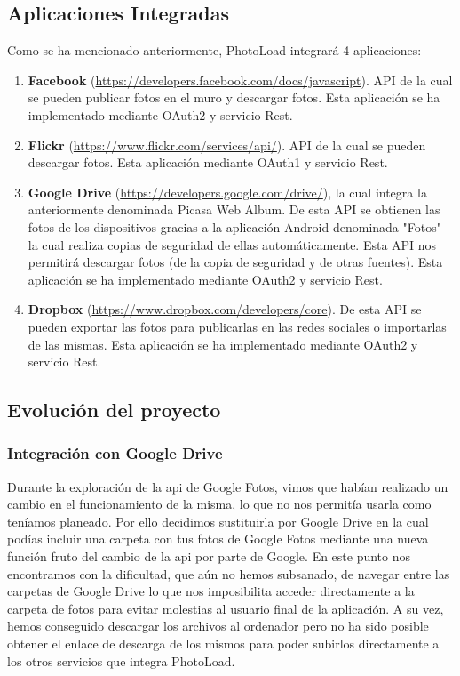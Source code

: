 \documentclass{scrartcl}
\begin{document}
\subsection{Aplicaciones Integradas}\label{cap:APIs Integradas}
Como se ha mencionado anteriormente, PhotoLoad integrará 4 aplicaciones:
\begin{enumerate}[\textbf{\textperiodcentered}]
	\item \textbf{Facebook} (\url{https://developers.facebook.com/docs/javascript}). API de la cual se pueden publicar fotos en el muro y descargar fotos. Esta aplicación se ha implementado mediante OAuth2 y servicio Rest.
	\item \textbf{Flickr} (\url{https://www.flickr.com/services/api/}). API de la cual se pueden descargar fotos. Esta aplicación mediante OAuth1 y servicio Rest.
	\item \textbf{Google Drive} (\url{https://developers.google.com/drive/}), la cual integra la anteriormente denominada Picasa Web Album. De esta API se obtienen las fotos de los dispositivos gracias a la aplicación Android denominada "Fotos" la cual realiza copias de seguridad de ellas automáticamente. Esta API nos permitirá descargar fotos (de la copia de seguridad y de otras fuentes). Esta aplicación se ha implementado mediante OAuth2 y servicio Rest.
	\item \textbf{Dropbox} (\url{https://www.dropbox.com/developers/core}). De esta API se pueden exportar las fotos para publicarlas en las redes sociales o importarlas de las mismas. Esta aplicación se ha implementado mediante OAuth2 y servicio Rest.
	
\end{enumerate}
\subsection{Evolución del proyecto}\label{cap:problemas encontrados}
\subsubsection{Integración con Google Drive}
Durante la exploración de la api de Google Fotos, vimos que habían realizado un cambio en el funcionamiento de la misma, lo que no nos permitía usarla como teníamos planeado. Por ello decidimos sustituirla por Google Drive en la cual podías incluir una carpeta con tus fotos de Google Fotos mediante una nueva función fruto del cambio de la api por parte de Google. En este punto nos encontramos con la dificultad, que aún no hemos subsanado, de navegar entre las carpetas de Google Drive lo que nos imposibilita acceder directamente a la carpeta de fotos para evitar molestias al usuario final de la aplicación. A su vez, hemos conseguido descargar los archivos al ordenador pero no ha sido posible obtener el enlace de descarga de los mismos para poder subirlos directamente a los otros servicios que integra PhotoLoad.
\end{document}
